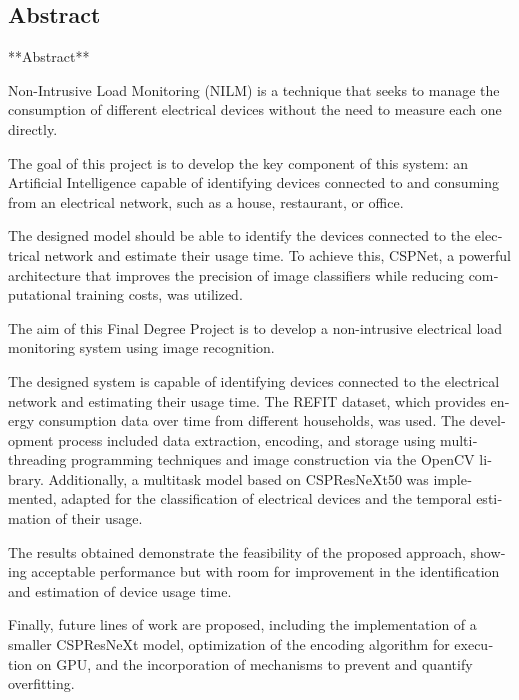 \begin{otherlanguage}{english}
  \chapter*{Abstract}

  **Abstract**

Non-Intrusive Load Monitoring (NILM) is a technique that seeks to manage the consumption of different electrical devices without the need to measure each one directly.

The goal of this project is to develop the key component of this system: an Artificial Intelligence capable of identifying devices connected to and consuming from an electrical network, such as a house, restaurant, or office.

The designed model should be able to identify the devices connected to the electrical network and estimate their usage time. To achieve this, CSPNet, a powerful architecture that improves the precision of image classifiers while reducing computational training costs, was utilized.

The aim of this Final Degree Project is to develop a non-intrusive electrical load monitoring system using image recognition.

The designed system is capable of identifying devices connected to the electrical network and estimating their usage time. The REFIT dataset, which provides energy consumption data over time from different households, was used. The development process included data extraction, encoding, and storage using multithreading programming techniques and image construction via the OpenCV library. Additionally, a multitask model based on CSPResNeXt50 was implemented, adapted for the classification of electrical devices and the temporal estimation of their usage.

The results obtained demonstrate the feasibility of the proposed approach, showing acceptable performance but with room for improvement in the identification and estimation of device usage time.

Finally, future lines of work are proposed, including the implementation of a smaller CSPResNeXt model, optimization of the encoding algorithm for execution on GPU, and the incorporation of mechanisms to prevent and quantify overfitting.
\end{otherlanguage}



